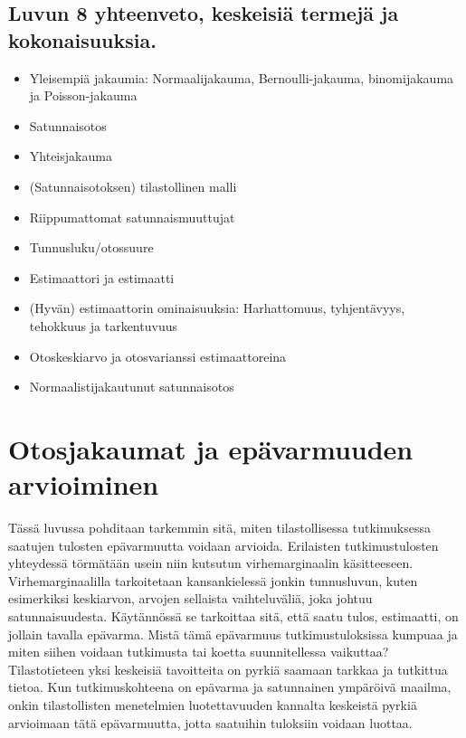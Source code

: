 \documentclass[
]{book}
\providecommand{\tightlist}{%
  \setlength{\itemsep}{0pt}\setlength{\parskip}{0pt}}
\begin{document}
\hypertarget{luvun-8-yhteenveto-keskeisiuxe4-termejuxe4-ja-kokonaisuuksia.}{%
\section{Luvun 8 yhteenveto, keskeisiä termejä ja kokonaisuuksia.}\label{luvun-8-yhteenveto-keskeisiuxe4-termejuxe4-ja-kokonaisuuksia.}}

\begin{itemize}
\tightlist
\item
  Yleisempiä jakaumia: Normaalijakauma, Bernoulli-jakauma, binomijakauma ja Poisson-jakauma
\item
  Satunnaisotos
\item
  Yhteisjakauma
\item
  (Satunnaisotoksen) tilastollinen malli
\item
  Riippumattomat satunnaismuuttujat
\item
  Tunnusluku/otossuure
\item
  Estimaattori ja estimaatti
\item
  (Hyvän) estimaattorin ominaisuuksia: Harhattomuus, tyhjentävyys, tehokkuus ja tarkentuvuus
\item
  Otoskeskiarvo ja otosvarianssi estimaattoreina
\item
  Normaalistijakautunut satunnaisotos
\end{itemize}


\hypertarget{luku9}{%
\chapter{Otosjakaumat ja epävarmuuden arvioiminen}\label{luku9}}

Tässä luvussa pohditaan tarkemmin sitä, miten tilastollisessa tutkimuksessa saatujen tulosten epävarmuutta voidaan arvioida. Erilaisten tutkimustulosten yhteydessä törmätään usein niin kutsutun virhemarginaalin käsitteeseen. Virhemarginaalilla tarkoitetaan kansankielessä jonkin tunnusluvun, kuten esimerkiksi keskiarvon, arvojen sellaista vaihteluväliä, joka johtuu satunnaisuudesta. Käytännössä se tarkoittaa sitä, että saatu tulos, estimaatti, on jollain tavalla epävarma. Mistä tämä epävarmuus tutkimustuloksissa kumpuaa ja miten siihen voidaan tutkimusta tai koetta suunnitellessa vaikuttaa? Tilastotieteen yksi keskeisiä tavoitteita on pyrkiä saamaan tarkkaa ja tutkittua tietoa. Kun tutkimuskohteena on epävarma ja satunnainen ympäröivä maailma, onkin tilastollisten menetelmien luotettavuuden kannalta keskeistä pyrkiä arvioimaan tätä epävarmuutta, jotta saatuihin tuloksiin voidaan luottaa.
\end{document}
